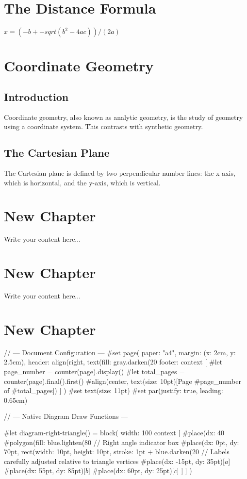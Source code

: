 \chapter{The Distance Formula}
$x = (-b +- sqrt(b^2 - 4a c)) / (2a)$

\chapter{Coordinate Geometry}
\section{Introduction}
Coordinate geometry, also known as analytic geometry, is the study of geometry using a coordinate system. This contrasts with synthetic geometry.

\section{The Cartesian Plane}
The Cartesian plane is defined by two perpendicular number lines: the x-axis, which is horizontal, and the y-axis, which is vertical.

\chapter{New Chapter}
Write your content here...

\chapter{New Chapter}
Write your content here...

\chapter{New Chapter}
// --- Document Configuration ---
#set page(
  paper: "a4",
  margin: (x: 2cm, y: 2.5cm),
  header: align(right, text(fill: gray.darken(20%
  footer: context [
    #let page_number = counter(page).display()
    #let total_pages = counter(page).final().first()
    #align(center, text(size: 10pt)[Page #page_number of #total_pages])
  ]
)
#set text(size: 11pt)
#set par(justify: true, leading: 0.65em)

// --- Native Diagram Draw Functions ---

#let diagram-right-triangle() = block(
  width: 100%
  context [
    #place(dx: 40%
      #polygon(fill: blue.lighten(80%
      // Right angle indicator box
      #place(dx: 0pt, dy: 70pt, rect(width: 10pt, height: 10pt, stroke: 1pt + blue.darken(20%
      // Labels carefully adjusted relative to triangle vertices
      #place(dx: -15pt, dy: 35pt)[$a$]
      #place(dx: 55pt, dy: 85pt)[$b$]
      #place(dx: 60pt, dy: 25pt)[$c$]
    ]
  ]
)

